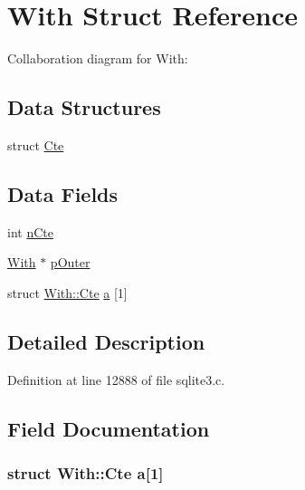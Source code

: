 \hypertarget{struct_with}{}\section{With Struct Reference}
\label{struct_with}


Collaboration diagram for With\+:
\subsection*{Data Structures}
\begin{DoxyCompactItemize}
\item 
struct \hyperlink{struct_with_1_1_cte}{Cte}
\end{DoxyCompactItemize}
\subsection*{Data Fields}
\begin{DoxyCompactItemize}
\item 
int \hyperlink{struct_with_aefe30147a9d64ed7677c1129cf205eea}{n\+Cte}
\item 
\hyperlink{struct_with}{With} $\ast$ \hyperlink{struct_with_a30c5baa75a7b429881952d15110aa4a6}{p\+Outer}
\item 
struct \hyperlink{struct_with_1_1_cte}{With\+::\+Cte} \hyperlink{struct_with_abdff385027bc33b2bf5a33762395fd78}{a} \mbox{[}1\mbox{]}
\end{DoxyCompactItemize}


\subsection{Detailed Description}


Definition at line 12888 of file sqlite3.\+c.



\subsection{Field Documentation}
\hypertarget{struct_with_abdff385027bc33b2bf5a33762395fd78}{}
\subsubsection[{a}]{\setlength{\rightskip}{0pt plus 5cm}struct {\bf With\+::\+Cte}  a\mbox{[}1\mbox{]}}\label{struct_with_abdff385027bc33b2bf5a33762395fd78}
\hypertarget{struct_with_aefe30147a9d64ed7677c1129cf205eea}{}
